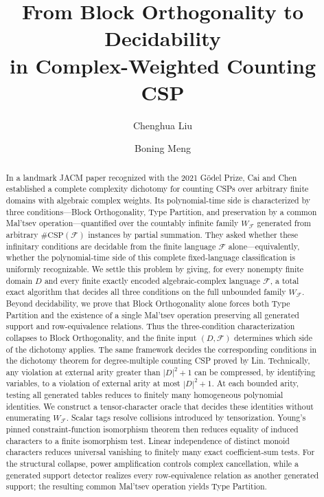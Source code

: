 \documentclass[11pt]{article}
\theoremstyle{plain}
\theoremstyle{definition}
\theoremstyle{remark}
\begin{document}
\title{From Block Orthogonality to 
Decidability \\[0.15em] in Complex-Weighted Counting CSP}

\author[1]{Chenghua Liu}
\author[2]{Boning Meng}

\date{}

\maketitle

\begin{abstract}
In a landmark JACM paper recognized with the 2021 G{\"o}del Prize, Cai and
Chen established a complete complexity dichotomy for counting CSPs over
arbitrary finite domains with algebraic complex weights.  Its polynomial-time
side is characterized by three conditions---Block Orthogonality, Type
Partition, and preservation by a common Mal'tsev operation---quantified over
the countably infinite family $W_{\mathcal{F}}$ generated from arbitrary
$\#\mathrm{CSP}(\mathcal{F})$ instances by partial summation.  They asked
whether these infinitary conditions are decidable from the finite language
$\mathcal{F}$ alone---equivalently, whether the polynomial-time side of this
complete fixed-language classification is uniformly recognizable.  We settle
this problem by giving, for every nonempty finite domain $D$ and every finite
exactly encoded algebraic-complex language $\mathcal{F}$, a total exact
algorithm that decides all three conditions on the full unbounded family
$W_{\mathcal{F}}$.  Beyond decidability, we prove that Block Orthogonality
alone forces both Type Partition and the existence of a single Mal'tsev
operation preserving all generated support and row-equivalence relations.
Thus the three-condition characterization collapses to Block Orthogonality,
and the finite input $(D,\mathcal{F})$ determines which side of the dichotomy
applies.  The same framework decides the corresponding conditions in the
dichotomy theorem for degree-multiple counting CSP proved by Lin.
Technically, any violation at external arity greater than $|D|^2+1$ can be
compressed, by identifying variables, to a violation of external arity at
most $|D|^2+1$.  At each bounded arity, testing all generated tables reduces
to finitely many homogeneous polynomial identities.  We construct a
tensor-character oracle that decides these identities without enumerating
$W_{\mathcal{F}}$.  Scalar tags resolve collisions introduced by
tensorization.  Young's pinned constraint-function isomorphism theorem then
reduces equality of induced characters to a finite isomorphism test.  Linear
independence of distinct monoid characters reduces universal vanishing to
finitely many exact coefficient-sum tests.  For the structural collapse,
power amplification controls complex cancellation, while a generated support
detector realizes every row-equivalence relation as another generated
support; the resulting common Mal'tsev operation yields Type Partition.
\end{abstract}
\end{document}
